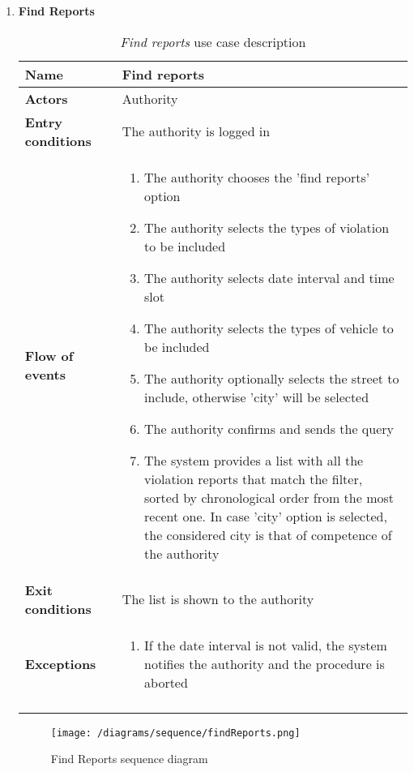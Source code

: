 \begin{enumerate}
				\FloatBarrier
			\item \textbf{Find Reports}
				\begin{longtable}{p{0.25\linewidth}p{0.75\linewidth}}
					\toprule
					\textbf{Name} & \textbf{Find reports} \\
					\midrule
					\textbf{Actors} & Authority\\
					\midrule
					\textbf{Entry conditions} & The authority is logged in \\
					\midrule
					\textbf{Flow of events} & 
					\begin{enumerate}
						\item The authority chooses the 'find reports' option
						\item The authority selects the types of violation to be included
						\item The authority selects date interval and time slot
						\item The authority selects the types of vehicle to be included
						\item The authority optionally selects the street to include, otherwise 'city' will be selected
						\item The authority confirms and sends the query
						\item The system provides a list with all the violation reports that match the filter, sorted by chronological order from the most recent one. In case 'city' option is selected, the considered city is that of competence of the authority
					\end{enumerate} \\
					\midrule
					\textbf{Exit conditions} & The list is shown to the authority\\
					\midrule
					\textbf{Exceptions} &  
					\begin{enumerate}
						\item If the date interval is not valid, the system notifies the authority and the procedure is aborted
					\end{enumerate}\\
					\bottomrule
					\caption{\emph{Find reports} use case description}
				\end{longtable}
	
				\begin{figure}[hbtp]
					\centering
					\texttt{[image: /diagrams/sequence/findReports.png]}
					\caption{Find Reports sequence diagram}
				\end{figure}
		\end{enumerate}

